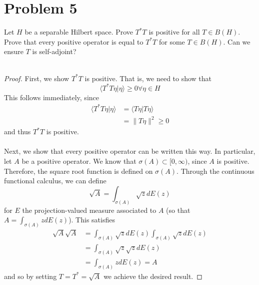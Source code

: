 \documentclass[fontsize=11pt]{scrartcl} %
\numberwithin{equation}{section} %
\numberwithin{figure}{section} %
\numberwithin{table}{section} %
\begin{document}
\section*{Problem 5}
Let $H$ be a separable Hilbert space. Prove $T^*T$ is positive for all $T\in
B(H)$. Prove that every positive operator is equal to $T^*T$ for some $T\in
B(H)$. Can we ensure $T$ is self-adjoint?
\\
\\
\begin{proof}
    First, we show $T^*T$ is positive. That is, we need to show that
    \[
\langle T^*T\eta|\eta\rangle\geq 0\forall \eta\in H
    \]
    This follows immediately, since
    \[
        \begin{aligned}
            \langle T^*T\eta|\eta\rangle &= \langle T\eta|T\eta\rangle\\
            &= \|T\eta\|^2 \geq 0
        \end{aligned}
    \]
    and thus $T^*T$ is positive.
    \\
    \\
    Next, we show that every positive operator can be written this way. In
    particular, let $A$ be a positive operator. We know that $\sigma(A)\subset
    [0,\infty)$, since $A$ is positive. Therefore, the square root function is
    defined on $\sigma(A)$. Through the continuous functional calculus, we can
    define
    \[
        \sqrt{A} = \int_{\sigma(A)}\sqrt{z}dE(z)
    \]
    for $E$ the projection-valued measure associated to $A$ (so that $A
    =\int_{\sigma(A)}zdE(z)$). This satisfies
    \[
        \begin{aligned}
        \sqrt{A}\sqrt{A} &=
        \int_{\sigma(A)}\sqrt{z}dE(z)\int_{\sigma(A)}\sqrt{z}dE(z)\\
        &= \int_{\sigma(A)}\sqrt{z}\sqrt{z}dE(z)\\
        &=\int_{\sigma(A)}zdE(z) = A
    \end{aligned}
    \]
    and so by setting $T=T^*=\sqrt{A}$ we achieve the desired result.
\end{proof}

\newpage
\end{document}
